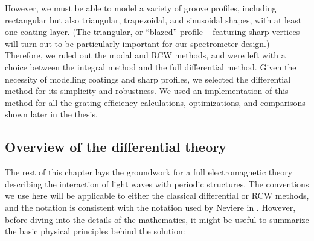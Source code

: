 However, we must be able to model a variety of groove profiles, including rectangular but also triangular, trapezoidal, and sinusoidal shapes, with at least one coating layer.  (The triangular, or ``blazed'' profile -- featuring sharp vertices -- will turn out to be particularly important for our spectrometer design.)  Therefore, we ruled out the modal and RCW methods, and were left with a choice between the integral method and the full differential method.    Given the necessity of modelling coatings and sharp profiles, we selected the differential method for its simplicity and robustness.  We used an implementation of this method for all the grating efficiency calculations, optimizations, 
and comparisons shown later in the thesis.

\subsection{Overview of the differential theory}
\label{overview}
The rest of this chapter lays the groundwork for a full electromagnetic theory describing the interaction of light waves with periodic structures.  The conventions we use here will be applicable to either the classical differential or RCW methods, and the notation is consistent with the notation used by Neviere in \cite{Nev02}.  However, before diving into the details of the mathematics, it might be useful to summarize the basic physical principles behind the solution:
